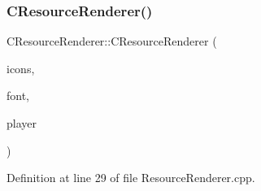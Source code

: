 \subsubsection{\texorpdfstring{C\+Resource\+Renderer()}{CResourceRenderer()}}
{\footnotesize\ttfamily C\+Resource\+Renderer\+::\+C\+Resource\+Renderer (\begin{DoxyParamCaption}\item[{std\+::shared\+\_\+ptr$<$ \hyperlink{classCGraphicTileset}{C\+Graphic\+Tileset} $>$}]{icons,  }\item[{std\+::shared\+\_\+ptr$<$ \hyperlink{classCFontTileset}{C\+Font\+Tileset} $>$}]{font,  }\item[{std\+::shared\+\_\+ptr$<$ \hyperlink{classCPlayerData}{C\+Player\+Data} $>$}]{player }\end{DoxyParamCaption})}



Definition at line 29 of file Resource\+Renderer.\+cpp.


